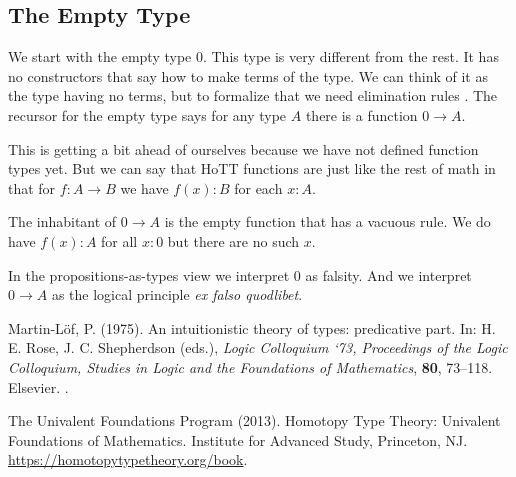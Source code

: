\documentclass[11pt]{article}
\begin{document}
\subsection{The Empty Type}

We start with the empty type $0$.  This type is very different from the
rest.  It has no constructors that say how to make terms of the type.
We can think of it as the type having no terms, but to formalize that we
need elimination rules .
The recursor for the empty type says for any type $A$ there is a function
$0 \to A$.

This is getting a bit ahead of ourselves because we have not defined function
types yet.  But we can say that HoTT functions are just like the rest of math
in that for $f : A \to B$ we have $f(x) : B$ for each $x : A$.

The inhabitant of $0 \to A$ is the empty function that has a vacuous rule.
We do have $f(x) : A$ for all $x : 0$ but there are no such $x$.

In the propositions-as-types view we interpret 0 as falsity.  And we
interpret $0 \to A$ as the logical principle \emph{ex falso quodlibet}.

\begin{thebibliography}{}

Martin-L\"{o}f, P. (1975).
\newblock An intuitionistic theory of types: predicative part.
\newblock In: H. E. Rose, J. C. Shepherdson (eds.),
    \emph{Logic Colloquium ‘73, Proceedings of the Logic Colloquium,
    Studies in Logic and the Foundations of Mathematics}, \textbf{80}, 73--118.
\newblock Elsevier.
\newblock {}.

The Univalent Foundations Program (2013).
\newblock Homotopy Type Theory: Univalent Foundations of Mathematics.
\newblock Institute for Advanced Study, Princeton, NJ.
\newblock \url{https://homotopytypetheory.org/book}.

\end{thebibliography}
\end{document}
